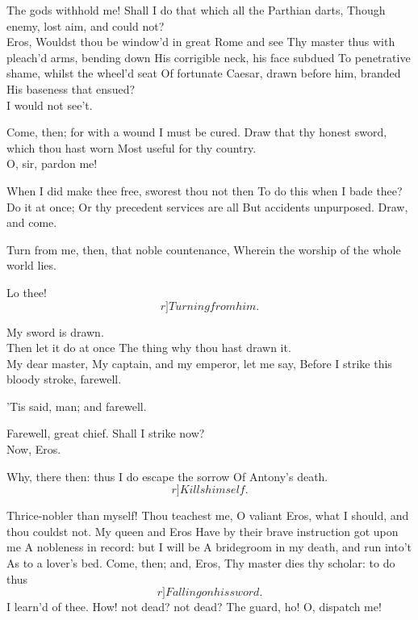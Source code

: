\documentclass{book}
\begin{document}
	The gods withhold me!
	Shall I do that which all the Parthian darts,
	Though enemy, lost aim, and could not? \\

\1	Eros,
	Wouldst thou be window'd in great Rome and see
	Thy master thus with pleach'd arms, bending down
	His corrigible neck, his face subdued
	To penetrative shame, whilst the wheel'd seat
	Of fortunate Caesar, drawn before him, branded
	His baseness that ensued? \\

	I would not see't.

\1	Come, then; for with a wound I must be cured.
	Draw that thy honest sword, which thou hast worn
	Most useful for thy country. \\

	O, sir, pardon me!

\1	When I did make thee free, sworest thou not then
	To do this when I bade thee? Do it at once;
	Or thy precedent services are all
	But accidents unpurposed. Draw, and come.

	Turn from me, then, that noble countenance,
	Wherein the worship of the whole world lies.

\1	Lo thee! \[r]Turning from him.\]

	My sword is drawn. \\

\1	                  Then let it do at once
	The thing why thou hast drawn it. \\

	My dear master,
	My captain, and my emperor, let me say,
	Before I strike this bloody stroke, farewell.

\1	'Tis said, man; and farewell.

	Farewell, great chief. Shall I strike now? \\

\1	Now, Eros.

	Why, there then: thus I do escape the sorrow
	Of Antony's death. \\ \[r]Kills himself.\]

\1	                  Thrice-nobler than myself!
	Thou teachest me, O valiant Eros, what
	I should, and thou couldst not. My queen and Eros
	Have by their brave instruction got upon me
	A nobleness in record: but I will be
	A bridegroom in my death, and run into't
	As to a lover's bed. Come, then; and, Eros,
	Thy master dies thy scholar: to do thus \[r]Falling on his sword.\]
	I learn'd of thee. How! not dead? not dead?
	The guard, ho! O, dispatch me! \\
\end{document}
